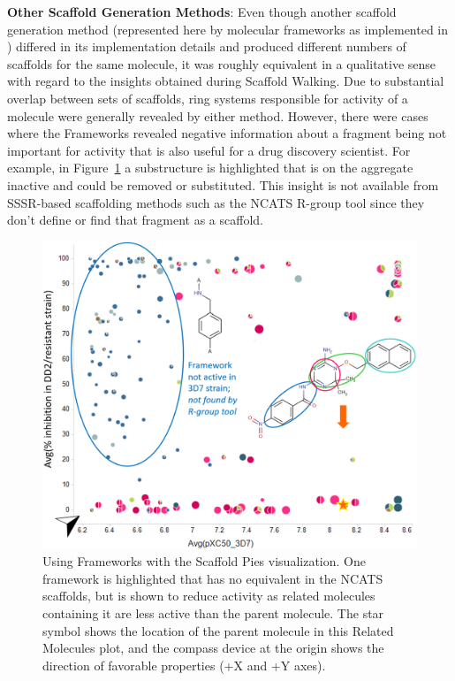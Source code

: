 \documentclass[11pt,letterpaper]{article}
\newcommand*\fref[1]{Figure~\ref{fig:#1}}
\begin{document}
{\bf Other Scaffold Generation Methods}: Even though another scaffold generation method (represented here by molecular frameworks as implemented in \cite{Harper2004DDclus}) differed in its implementation details and produced different numbers of scaffolds for the same molecule, it was roughly equivalent in a qualitative sense with regard to the insights obtained during Scaffold Walking. Due to substantial overlap between sets of scaffolds, ring systems responsible for activity of a molecule were generally revealed by either method. However, there were cases where the Frameworks revealed negative information about a fragment being not important for activity that is also useful for a drug discovery scientist. For example, in \fref{frameswalk} a substructure is highlighted that is on the aggregate inactive and could be removed or substituted. This insight is not available from SSSR-based scaffolding methods such as the NCATS R-group tool since they don't define or find that fragment as a scaffold.

\begin{figure}
\includegraphics[width=5in]{../fig/mol1_frames_scafpie_v2.png}
\caption{Using Frameworks with the Scaffold Pies visualization. One framework is highlighted that has no equivalent in the NCATS scaffolds, but is shown to reduce activity as related molecules containing it are less active than the parent molecule.   The star symbol shows the location of the parent molecule in this Related Molecules plot, and the compass device at the origin shows the direction of favorable properties (+X and +Y axes).}      
\label{fig:frameswalk}
\end{figure}
\end{document}
